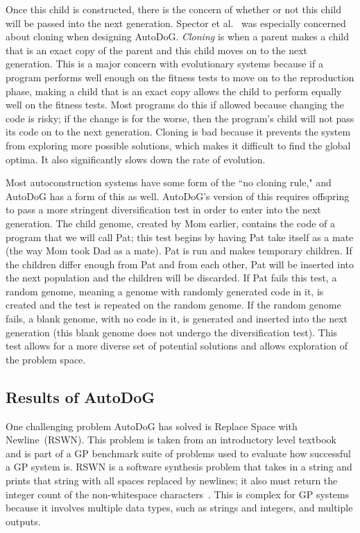 \documentclass{sig-alternate}
\begin{document}
Once this child is constructed, there is the concern of whether or not this child will be passed into the next generation. Spector et al.~\cite{spector:2016} was especially concerned about cloning when designing AutoDoG. \textit{Cloning} is when a parent makes a child that is an exact copy of the parent and this child moves on to the next generation. This is a major concern with evolutionary systems because if a program performs well enough on the fitness tests to move on to the reproduction phase, making a child that is an exact copy allows the child to perform equally well on the fitness tests. Most programs do this if allowed because changing the code is risky; if the change is for the worse, then the program's child will not pass its code on to the next generation. Cloning is bad because it prevents the system from exploring more possible solutions, which makes it difficult to find the global optima. It also significantly slows down the rate of evolution.

Most autoconstruction systems have some form of the ``no cloning rule," and AutoDoG has a form of this as well. AutoDoG's version of this requires offspring to pass a more stringent diversification test in order to enter into the next generation. The child genome, created by Mom earlier, contains the code of a program that we will call Pat; this test begins by having Pat take itself as a mate (the way Mom took Dad as a mate). Pat is run and makes temporary children. If the children differ enough from Pat and from each other, Pat will be inserted into the next population and the children will be discarded. If Pat fails this test, a random genome, meaning a genome with randomly generated code in it, is created and the test is repeated on the random genome. If the random genome fails, a blank genome, with no code in it, is generated and inserted into the next generation (this blank genome does not undergo the diversification test). This test allows for a more diverse set of potential solutions and allows exploration of the problem space.

\subsection{Results of AutoDoG}
\label{sec:results}

One challenging problem AutoDoG has solved is Replace Space with Newline~(RSWN). This problem is taken from an introductory level textbook and is part of a GP benchmark suite of problems used to evaluate how successful a GP system is. RSWN is a software synthesis problem that takes in a string and prints that string with all spaces replaced by newlines; it also must return the integer count of the non-whitespace characters~\cite{helmuth:2015}. This is complex for GP systems because it involves multiple data types, such as strings and integers, and multiple outputs.
\end{document}

